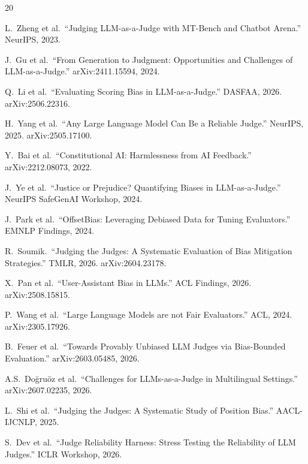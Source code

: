 \documentclass[11pt,twocolumn]{article}
\begin{document}
\begin{thebibliography}{20}

L.~Zheng et al.\ ``Judging LLM-as-a-Judge with MT-Bench and Chatbot Arena.'' NeurIPS, 2023.

J.~Gu et al.\ ``From Generation to Judgment: Opportunities and Challenges of LLM-as-a-Judge.'' arXiv:2411.15594, 2024.

Q.~Li et al.\ ``Evaluating Scoring Bias in LLM-as-a-Judge.'' DASFAA, 2026. arXiv:2506.22316.

H.~Yang et al.\ ``Any Large Language Model Can Be a Reliable Judge.'' NeurIPS, 2025. arXiv:2505.17100.

Y.~Bai et al.\ ``Constitutional AI: Harmlessness from AI Feedback.'' arXiv:2212.08073, 2022.

J.~Ye et al.\ ``Justice or Prejudice? Quantifying Biases in LLM-as-a-Judge.'' NeurIPS SafeGenAI Workshop, 2024.

J.~Park et al.\ ``OffsetBias: Leveraging Debiased Data for Tuning Evaluators.'' EMNLP Findings, 2024.

R.~Soumik.\ ``Judging the Judges: A Systematic Evaluation of Bias Mitigation Strategies.'' TMLR, 2026. arXiv:2604.23178.

X.~Pan et al.\ ``User-Assistant Bias in LLMs.'' ACL Findings, 2026. arXiv:2508.15815.

P.~Wang et al.\ ``Large Language Models are not Fair Evaluators.'' ACL, 2024. arXiv:2305.17926.

B.~Feuer et al.\ ``Towards Provably Unbiased LLM Judges via Bias-Bounded Evaluation.'' arXiv:2603.05485, 2026.

A.S.~Do\u{g}ru\"oz et al.\ ``Challenges for LLMs-as-a-Judge in Multilingual Settings.'' arXiv:2607.02235, 2026.

L.~Shi et al.\ ``Judging the Judges: A Systematic Study of Position Bias.'' AACL-IJCNLP, 2025.

S.~Dev et al.\ ``Judge Reliability Harness: Stress Testing the Reliability of LLM Judges.'' ICLR Workshop, 2026.

\end{thebibliography}
\end{document}
